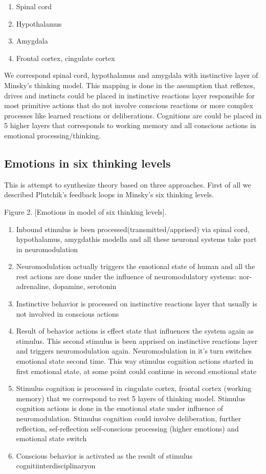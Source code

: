 \begin{enumerate}
\item  Spinal cord
\item  Hypothalamus
\item  Amygdala
\item  Frontal cortex, cingulate cortex
\end{enumerate}

We correspond spinal cord, hypothalamus and amygdala with instinctive layer of Minsky's thinking model. This mapping is done in the assumption that reflexes, drives and instincts could be placed in instinctive reactions layer responsible for most primitive actions that do not involve conscious reactions or more complex processes like learned reactions or deliberations. Cognitions are could be placed in 5 higher layers that corresponds to working memory and all conscious actions in emotional processing/thinking.

\subsection{Emotions in six thinking levels}

This is attempt to synthesize theory based on three approaches. First of all we described Plutchik's feedback loops\cite{natureofemotions} in Minsky's six thinking levels.


Figure 2. [Emotions in model of six thinking levels].

\begin{enumerate}
\item  Inbound stimulus is been processed(transmitted/apprised) via spinal cord, hypothalamus, amygdathis modella and all these neuronal systems take part in neuromodulation
\item  Neuromodulation actually triggers the emotional state of human and all the rest actions are done under the influence of neuromodulatory systems: nor-adrenaline, dopamine, serotonin
\item  Instinctive behavior is processed on instinctive reactions layer that usually is not involved in conscious actions
\item  Result of behavior actions is effect state that influences the system again as stimulus. This second stimulus is been apprised on instinctive reactions layer and triggers neuromodulation again. Neuromodulation in it's turn switches emotional state second time. This way stimulus cognition actions started in first emotional state, at some point could continue in second emotional state
\item  Stimulus cognition is processed in cingulate cortex, frontal cortex (working memory) that we correspond to rest 5 layers of thinking model. Stimulus cognition actions is done in the emotional state under influence of neuromodulation. Stimulus cognition could involve deliberation, further reflection, sef-reflection self-conscious processing (higher emotions) and  emotional state switch
\item  Conscious behavior is activated as the result of stimulus cognitiinterdisciplinaryon
\end{enumerate}

